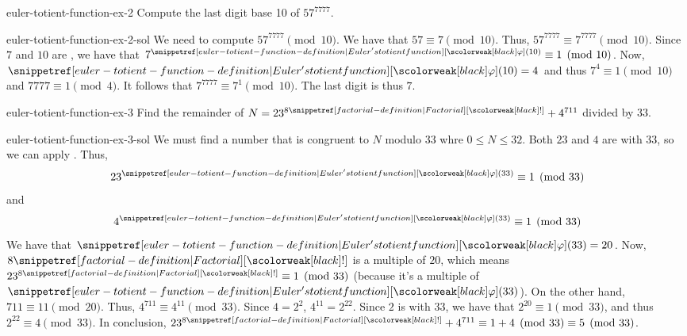 \documentclass[preview]{standalone}
\begin{document}
\begin{snippetexercise}{euler-totient-function-ex-2}{}
    Compute the last digit base 10 of \(57^{7777}\).
\end{snippetexercise}

\begin{snippetsolution}{euler-totient-function-ex-2-sol}{}
    We need to compute \(57^{7777} \pmod{10}\).
    We have that \(57 \equiv 7 \pmod{10}\).
    Thus, \(57^{7777} \equiv 7^{7777} \pmod{10}\).
    Since \(7\) and \(10\) are \coprime, we have that \(7^{\eulertotient(10)} \equiv 1 \pmod{10}\). %
    Now, \(\eulertotient(10) = 4\) and thus \(7^4 \equiv 1 \pmod{10}\)
    and \(7777 \equiv 1 \pmod{4}\). It follows that \(7^{7777} \equiv 7^1 \pmod{10}\).
    The last digit is thus \(7\).
\end{snippetsolution}

\begin{snippetexercise}{euler-totient-function-ex-3}{}
    Find the remainder of \(N=23^{8\factorial} + 4^{711}\) divided by \(33\).
\end{snippetexercise}

\begin{snippetsolution}{euler-totient-function-ex-3-sol}{}
    We must find a number that is congruent to \(N\) modulo \(33\)
    whre \(0 \leq N \leq 32\).
    Both \(23\) and \(4\) are \coprime with \(33\), so we can apply \eulertheorem.
    Thus,\[
        23^{\eulertotient(33)} \equiv 1 \pmod{33}
    \]
    and
    \[
        4^{\eulertotient(33)} \equiv 1 \pmod{33}
    \]
    We have that \(\eulertotient(33) = 20\).
    Now, \(8\factorial\) is a multiple of \(20\), which means \(23^{8\factorial} \equiv 1 \pmod{33}\)
    (because it's a multiple of \(\eulertotient(33)\)).
    On the other hand, \(711 \equiv 11 \pmod{20}\). Thus, \(4^{711} \equiv 4^{11} \pmod{33}\).
    Since \(4=2^2\), \(4^{11} = 2^{22}\).
    Since \(2\) is \coprime with \(33\), we have that \(2^{20} \equiv 1 \pmod{33}\),
    and thus \(2^{22} \equiv 4 \pmod{33}\).
    In conclusion, \(23^{8\factorial} + 4^{711} \equiv 1 + 4 \pmod{33} \equiv 5 \pmod{33}\).
\end{snippetsolution}
\end{document}
